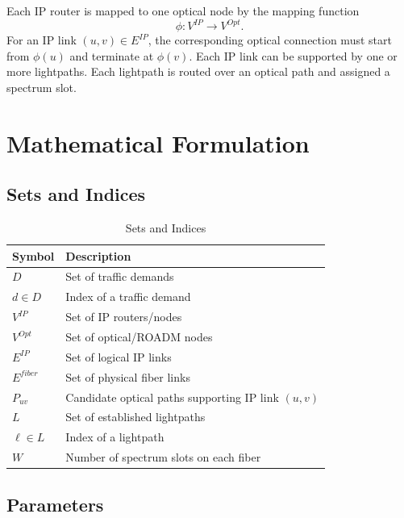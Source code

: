 \documentclass[journal,10pt]{IEEEtran}
\begin{document}
Each IP router is mapped to one optical node by the mapping function
\begin{equation}
    \phi: V^{IP} \rightarrow V^{Opt}.
\end{equation}
For an IP link $(u,v)\in E^{IP}$, the corresponding optical connection must start from $\phi(u)$ and terminate at $\phi(v)$. Each IP link can be supported by one or more lightpaths. Each lightpath is routed over an optical path and assigned a spectrum slot.

\section{Mathematical Formulation}

\subsection{Sets and Indices}

\begin{table}[t]
\caption{Sets and Indices}
\label{tab:sets}
\centering
\begin{tabularx}{\columnwidth}{L{0.24\columnwidth}Y}
\toprule
\textbf{Symbol} & \textbf{Description} \\
\midrule
$D$ & Set of traffic demands \\
$d \in D$ & Index of a traffic demand \\
$V^{IP}$ & Set of IP routers/nodes \\
$V^{Opt}$ & Set of optical/ROADM nodes \\
$E^{IP}$ & Set of logical IP links \\
$E^{fiber}$ & Set of physical fiber links \\
$P_{uv}$ & Candidate optical paths supporting IP link $(u,v)$ \\
$L$ & Set of established lightpaths \\
$\ell \in L$ & Index of a lightpath \\
$W$ & Number of spectrum slots on each fiber \\
\bottomrule
\end{tabularx}
\end{table}

\subsection{Parameters}
\end{document}
